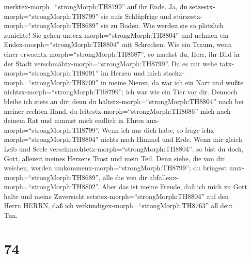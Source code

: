 merktex-morph=``strongMorph:TH8799'' auf ihr Ende.  Ja, du
setzestx-morph=``strongMorph:TH8799'' sie aufs Schlüpfrige und
stürzestx-morph=``strongMorph:TH8689'' sie zu Boden.  Wie
werden sie so plötzlich zunichte! Sie gehen
unterx-morph=``strongMorph:TH8804'' und nehmen ein
Endex-morph=``strongMorph:TH8804'' mit Schrecken.  Wie ein
Traum, wenn einer erwachtx-morph=``strongMorph:TH8687'', so machst du,
Herr, ihr Bild in der Stadt verschmähtx-morph=``strongMorph:TH8799''.
 Da es mir wehe tatx-morph=``strongMorph:TH8691'' im Herzen
und mich stachx-morph=``strongMorph:TH8709'' in meine Nieren,
 da war ich ein Narr und wußte
nichtsx-morph=``strongMorph:TH8799''; ich war wie ein Tier vor dir.
 Dennoch bleibe ich stets an dir; denn du
hältstx-morph=``strongMorph:TH8804'' mich bei meiner rechten Hand,
 du leitestx-morph=``strongMorph:TH8686'' mich nach deinem
Rat und nimmst mich endlich in Ehren anx-morph=``strongMorph:TH8799''.
 Wenn ich nur dich habe, so frage
ichx-morph=``strongMorph:TH8804'' nichts nach Himmel und Erde.
 Wenn mir gleich Leib und Seele
verschmachtetx-morph=``strongMorph:TH8804'', so bist du doch, Gott,
allezeit meines Herzens Trost und mein Teil.  Denn siehe,
die von dir weichen, werden umkommenx-morph=``strongMorph:TH8799''; du
bringest umx-morph=``strongMorph:TH8689'', alle die von dir
abfallenx-morph=``strongMorph:TH8802''.  Aber das ist meine
Freude, daß ich mich zu Gott halte und meine Zuversicht
setztex-morph=``strongMorph:TH8804'' auf den Herrn HERRN, daß ich
verkündigex-morph=``strongMorph:TH8763'' all dein Tun.

\hypertarget{section-73}{%
\section{74}\label{section-73}}

